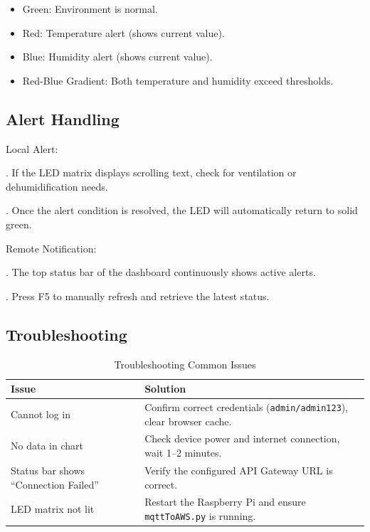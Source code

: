 \documentclass[12pt,a4paper]{article}
\begin{document}
\begin{itemize}
  \item Green: Environment is normal.
  \item Red: Temperature alert (shows current value).
  \item Blue: Humidity alert (shows current value).
  \item Red-Blue Gradient: Both temperature and humidity exceed thresholds.
\end{itemize}

\subsection{Alert Handling}
Local Alert:

. If the LED matrix displays scrolling text, check for ventilation or dehumidification needs.

. Once the alert condition is resolved, the LED will automatically return to solid green.

\noindent
Remote Notification:

. The top status bar of the dashboard continuously shows active alerts.

. Press F5 to manually refresh and retrieve the latest status.

\subsection{Troubleshooting}

\begin{table}[h!]
\centering
\renewcommand{\arraystretch}{1.3}  
\setlength{\tabcolsep}{10pt}      
\begin{tabular}{|p{5cm}|p{9cm}|}
\hline
\textbf{Issue} & \textbf{Solution} \\
\hline
Cannot log in & Confirm correct credentials (\texttt{admin/admin123}), clear browser cache. \\
\hline
No data in chart & Check device power and internet connection, wait 1–2 minutes. \\
\hline
Status bar shows ``Connection Failed'' & Verify the configured API Gateway URL is correct. \\
\hline
LED matrix not lit & Restart the Raspberry Pi and ensure \texttt{mqttToAWS.py} is running. \\
\hline
\end{tabular}
\caption{Troubleshooting Common Issues}
\label{tab:troubleshooting}
\end{table}





\end{document}
